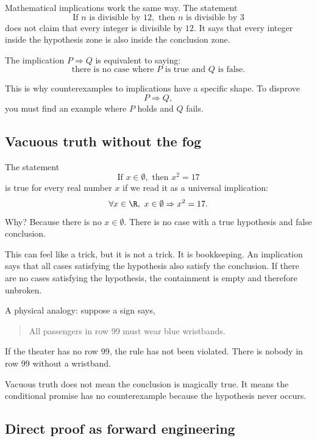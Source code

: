 Mathematical implications work the same way. The statement
\[
\text{If }n\text{ is divisible by }12,\text{ then }n\text{ is divisible by }3
\]
does not claim that every integer is divisible by $12$. It says that every integer inside the hypothesis zone is also inside the conclusion zone.

\begin{formalbox}
The implication $P\Rightarrow Q$ is equivalent to saying:
\[
\text{there is no case where }P\text{ is true and }Q\text{ is false.}
\]
\end{formalbox}

This is why counterexamples to implications have a specific shape. To disprove
\[
P\Rightarrow Q,
\]
you must find an example where $P$ holds and $Q$ fails.

\subsection{Vacuous truth without the fog}

The statement
\[
\text{If }x\in\emptyset,\text{ then }x^2=17
\]
is true for every real number $x$ if we read it as a universal implication:
\[
\forall x\in\R,\ x\in\emptyset\Rightarrow x^2=17.
\]
Why? Because there is no $x\in\emptyset$. There is no case with a true hypothesis and false conclusion.

This can feel like a trick, but it is not a trick. It is bookkeeping. An implication says that all cases satisfying the hypothesis also satisfy the conclusion. If there are no cases satisfying the hypothesis, the containment is empty and therefore unbroken.

A physical analogy: suppose a sign says,

\begin{quote}
All passengers in row 99 must wear blue wristbands.
\end{quote}

If the theater has no row 99, the rule has not been violated. There is nobody in row 99 without a wristband.

\begin{trapbox}
Vacuous truth does not mean the conclusion is magically true. It means the conditional promise has no counterexample because the hypothesis never occurs.
\end{trapbox}

\subsection{Direct proof as forward engineering}

